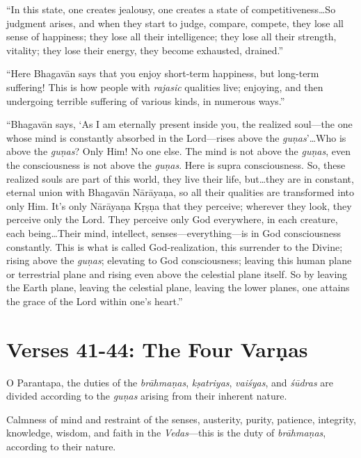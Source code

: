 \enquote{In this state, one creates jealousy, one creates a state of competitiveness\ldots So judgment arises, and when they start to judge, compare, compete, they lose all sense of happiness; they lose all their intelligence; they lose all their strength, vitality; they lose their energy, they become exhausted, drained.}

\enquote{Here Bhagavān says that you enjoy short-term happiness, but long-term suffering! This is how people with \textit{rajasic} qualities live; enjoying, and then undergoing terrible suffering of various kinds, in numerous ways.}

\enquote{Bhagavān says, \enquote{As I am eternally present inside you, the realized soul---the one whose mind is constantly absorbed in the Lord---rises above the \textit{guṇas}}\ldots Who is above the \textit{guṇas}? Only Him! No one else. The mind is not above the \textit{guṇas}, even the consciousness is not above the \textit{guṇas}. Here is supra consciousness. So, these realized souls are part of this world, they live their life, but\ldots they are in constant, eternal union with Bhagavān Nārāyaṇa, so all their qualities are transformed into only Him. It’s only Nārāyaṇa Kṛṣṇa that they perceive; wherever they look, they perceive only the Lord. They perceive only God everywhere, in each creature, each being\ldots Their mind, intellect, senses---everything---is in God consciousness constantly. This is what is called God-realization, this surrender to the Divine; rising above the \textit{guṇas}; elevating to God consciousness; leaving this human plane or terrestrial plane and rising even above the celestial plane itself. So by leaving the Earth plane, leaving the celestial plane, leaving the lower planes, one attains the grace of the Lord within one’s heart.}

\section{Verses 41-44: The Four Varṇas}\label{sec-verses-41-44-the-four-varnas}

{O Parantapa, the duties of the \textit{brāhmaṇas}, \textit{kṣatriyas}, \textit{vaiśyas}, and \textit{śūdras} are divided according to the \textit{guṇas} arising from their inherent nature.}

{Calmness of mind and restraint of the senses, austerity, purity, patience, integrity, knowledge, wisdom, and faith in the \textit{Vedas}---this is the duty of \textit{brāhmaṇas}, according to their nature.}

